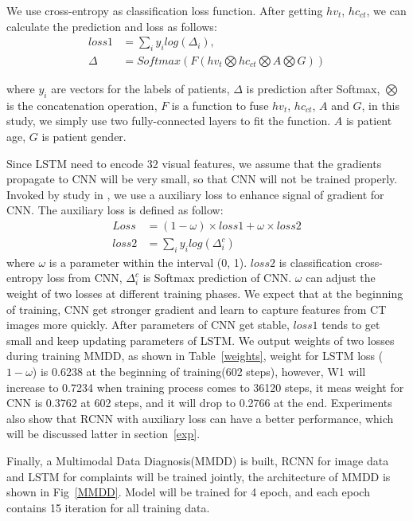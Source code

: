 \documentclass[runningheads]{llncs}
\begin{document}
We use cross-entropy as classification loss function\cite{Zreik2018A}. After getting $hv_t$, $hc_{ct}$, we can calculate the prediction and loss as follows:
\begin{align*}\label{classifyandloss1}
    loss1 &= \sum_i{y_i log(\Delta_i)}, \\
    \Delta &= Softmax(F(hv_t \bigotimes hc_{ct} \bigotimes A \bigotimes G))
\end{align*}

where $y_i$ are vectors for the labels of patients, $\Delta$ is prediction after Softmax, $\bigotimes$ is the concatenation operation, $F$ is a function to fuse $hv_t$, $hc_{ct}$, $A$ and $G$, in this study, we simply use two fully-connected layers to fit the function. $A$ is patient age, $G$ is patient gender.

Since LSTM need to encode 32 visual features, we assume that the gradients propagate to CNN will be very small, so that CNN will not be trained properly. Invoked by study in \cite{szegedy2016rethinking}, we use a auxiliary loss to enhance signal of gradient for CNN.
The auxiliary loss is defined as follow: 
\begin{align*}
Loss &=  (1 - \omega) \times loss1 +  \omega \times loss2 \\
loss2 &= \sum_i{y_i log(\Delta^c_i)}
\end{align*}
where $\omega$ is a parameter within the interval (0, 1). $loss2$ is classification cross-entropy loss from CNN, $\Delta^c_i$ is Softmax prediction of CNN. $\omega$ can adjust the weight of two losses at different training phases.
We expect that at the beginning of training, CNN get stronger gradient and learn to capture features from CT images more quickly. After parameters of CNN get stable, $loss1$ tends to get small and keep updating parameters of LSTM. We output weights of two losses during training MMDD, as shown in Table~\ref{weights}, weight for LSTM loss ($1 - \omega$) is 0.6238 at the beginning of training(602 steps), however, W1 will increase to 0.7234 when training process comes to 36120 steps, it meas weight for CNN is 0.3762 at 602 steps, and it will drop to 0.2766 at the end. Experiments also show that RCNN with auxiliary loss can have a better performance, which will be discussed latter in section~\ref{exp}.

Finally, a Multimodal Data Diagnosis(MMDD) is built, RCNN for image data and LSTM for complaints will be trained jointly, the architecture of MMDD is shown in Fig~\ref{MMDD}. Model will be trained for 4 epoch, and each epoch contains 15 iteration for all training data.
\end{document}

